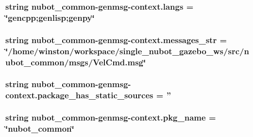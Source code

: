 \hypertarget{namespacenubot__common-genmsg-context_ad47fe39b5ca574c609a0a44451d67ebe}{
\subsubsection[{langs}]{\setlength{\rightskip}{0pt plus 5cm}string nubot\-\_\-common-\/genmsg-\/context.\-langs = \char`\"{}gencpp;genlisp;genpy\char`\"{}}}\label{namespacenubot__common-genmsg-context_ad47fe39b5ca574c609a0a44451d67ebe}
\hypertarget{namespacenubot__common-genmsg-context_a9d82d20e4ffa677c598751d6630dc734}{
\subsubsection[{messages\-\_\-str}]{\setlength{\rightskip}{0pt plus 5cm}string nubot\-\_\-common-\/genmsg-\/context.\-messages\-\_\-str = \char`\"{}/home/winston/workspace/single\-\_\-nubot\-\_\-gazebo\-\_\-ws/src/nubot\-\_\-common/msgs/Vel\-Cmd.\-msg\char`\"{}}}\label{namespacenubot__common-genmsg-context_a9d82d20e4ffa677c598751d6630dc734}
\hypertarget{namespacenubot__common-genmsg-context_a9b23bed4614ce829e09eb98736bbcfb6}{
\subsubsection[{package\-\_\-has\-\_\-static\-\_\-sources}]{\setlength{\rightskip}{0pt plus 5cm}string nubot\-\_\-common-\/genmsg-\/context.\-package\-\_\-has\-\_\-static\-\_\-sources = ''}}\label{namespacenubot__common-genmsg-context_a9b23bed4614ce829e09eb98736bbcfb6}
\hypertarget{namespacenubot__common-genmsg-context_aa7e82af182943505146665259b8e1ce9}{
\subsubsection[{pkg\-\_\-name}]{\setlength{\rightskip}{0pt plus 5cm}string nubot\-\_\-common-\/genmsg-\/context.\-pkg\-\_\-name = \char`\"{}nubot\-\_\-common\char`\"{}}}\label{namespacenubot__common-genmsg-context_aa7e82af182943505146665259b8e1ce9}
